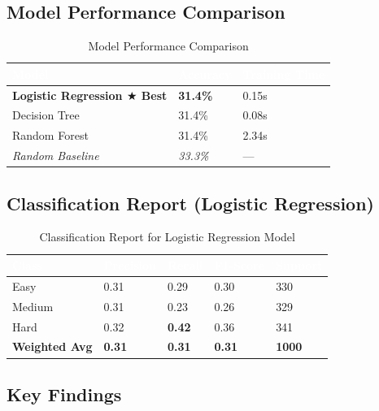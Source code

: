 \documentclass[12pt,a4paper]{article}
\begin{document}
\subsection{Model Performance Comparison}

\begin{table}[H]
\centering
\begin{tabular}{|L{6cm}|C{3cm}|C{3cm}|}
\hline
{}
\textcolor{white}{\textbf{Model}} &
\textcolor{white}{\textbf{Accuracy}} &
\textcolor{white}{\textbf{Training Time}} \\
\hline
\textbf{Logistic Regression $\bigstar$ Best} & \textbf{31.4\%} & 0.15s \\
\hline
{}
Decision Tree & 31.4\% & 0.08s \\
\hline
Random Forest & 31.4\% & 2.34s \\
\hline
{}
\textit{Random Baseline} & \textit{33.3\%} & --- \\
\hline
\end{tabular}
\caption{Model Performance Comparison}
\end{table}

\subsection{Classification Report (Logistic Regression)}

\begin{table}[H]
\centering
\begin{tabular}{|L{3.5cm}|C{2.5cm}|C{2.5cm}|C{2.5cm}|C{2cm}|}
\hline
{}
\textcolor{white}{\textbf{Class}} &
\textcolor{white}{\textbf{Precision}} &
\textcolor{white}{\textbf{Recall}} &
\textcolor{white}{\textbf{F1-Score}} &
\textcolor{white}{\textbf{Support}} \\
\hline
Easy & 0.31 & 0.29 & 0.30 & 330 \\
\hline
{}
Medium & 0.31 & 0.23 & 0.26 & 329 \\
\hline
Hard & 0.32 & \textcolor{successgreen}{\textbf{0.42}} & 0.36 & 341 \\
\hline
{}
\textbf{Weighted Avg} & \textbf{0.31} & \textbf{0.31} & \textbf{0.31} & \textbf{1000} \\
\hline
\end{tabular}
\caption{Classification Report for Logistic Regression Model}
\end{table}

\subsection{Key Findings}
\end{document}

